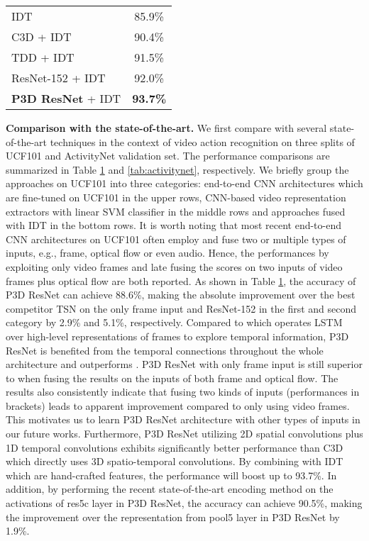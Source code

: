 \documentclass[10pt,twocolumn,letterpaper]{article}
\begin{document}
\begin{table}
\begin{tabular}{l|c}
IDT \cite{wang2013action}                                   & 85.9\%          \\
C3D + IDT \cite{tran2015learning}                           & 90.4\%          \\
TDD + IDT \cite{wang2015action}                             & 91.5\%          \\
ResNet-152 + IDT                                             & 92.0\%          \\
\textbf{P3D ResNet} + IDT                                & \textbf{93.7\%}          \\ \hline
\end{tabular}
\label{tab:ucf101}
\vspace{-0.25in}
\end{table}


\textbf{Comparison with the state-of-the-art.} We first compare with several state-of-the-art techniques in the context of video action recognition on three splits of UCF101 and ActivityNet validation set. The performance comparisons are summarized in Table \ref{tab:ucf101} and \ref{tab:activitynet}, respectively. We briefly group the approaches on UCF101 into three categories: end-to-end CNN architectures which are fine-tuned on UCF101 in the upper rows, CNN-based video representation extractors with linear SVM classifier in the middle rows and approaches fused with IDT in the bottom rows. It is worth noting that most recent end-to-end CNN architectures on UCF101 often employ and fuse two or multiple types of inputs, e.g., frame, optical flow or even audio. Hence, the performances by exploiting only video frames and late fusing the scores on two inputs of video frames plus optical flow are both reported. As shown in Table \ref{tab:ucf101}, the accuracy of P3D ResNet can achieve 88.6\%, making the absolute improvement over the best competitor TSN on the only frame input and ResNet-152 in the first and second category by 2.9\% and 5.1\%, respectively. Compared to \cite{yue2015beyond} which operates LSTM over high-level representations of frames to explore temporal information, P3D ResNet is benefited from the temporal connections throughout the whole architecture and outperforms \cite{yue2015beyond}. P3D ResNet with only frame input is still superior to \cite{simonyan2014two,sun2015human,yue2015beyond} when fusing the results on the inputs of both frame and optical flow. The results also consistently indicate that fusing two kinds of inputs (performances in brackets) leads to apparent improvement compared to only using video frames. This motivates us to learn P3D ResNet architecture with other types of inputs in our future works. Furthermore, P3D ResNet utilizing 2D spatial convolutions plus 1D temporal convolutions exhibits significantly better performance than C3D which directly uses 3D spatio-temporal convolutions. By combining with IDT \cite{wang2013action} which are hand-crafted features, the performance will boost up to 93.7\%. In addition, by performing the recent state-of-the-art encoding method \cite{qiu2017deep} on the activations of res5c layer in P3D ResNet, the accuracy can achieve 90.5\%, making the improvement over the representation from pool5 layer in P3D ResNet by 1.9\%.
\end{document}
